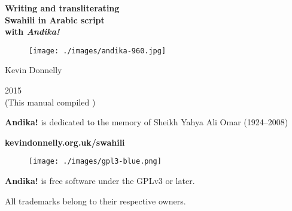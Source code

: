 \begin{titlepage}
\begin{center}

{\Huge\textbf{Writing and transliterating}}\\[0.5cm]
{\Huge\textbf{Swahili in Arabic script}}\\[0.5cm]
{\Huge\textbf{with \textit{Andika!}}}

\vspace{2cm}

\begin{figure}[h]
 \centering
 \texttt{[image: ./images/andika-960.jpg]}
\end{figure}
\vspace{2cm}


{\LARGE{Kevin Donnelly}}
\vspace{1.5cm}

{\Large{2015}}\\
(This manual compiled \todayuk)

\vspace{1.5cm}
\textbf{Andika!} is dedicated to the memory of Sheikh Yahya Ali Omar (1924--2008)\\

\textbf{kevindonnelly.org.uk/swahili}
\begin{figure}[H]
 \centering
 \texttt{[image: ./images/gpl3-blue.png]}
\end{figure}

\textbf{Andika!} is free software under the GPLv3 or later.

All trademarks belong to their respective owners.

\end{center}
\end{titlepage}


\tableofcontents  %
\listoffigures
\listoftables

